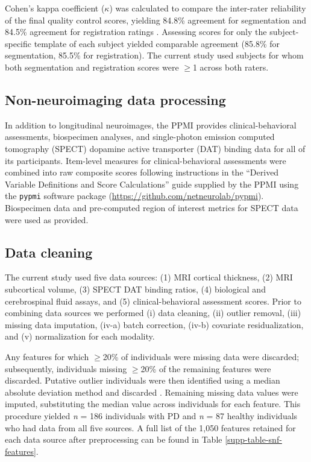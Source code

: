 \documentclass[12pt,aps,pra,reprint,showkeys]{revtex4-1}
\begin{document}
Cohen's kappa coefficient ($\kappa$) was calculated to compare the inter-rater reliability of the final quality control scores, yielding 84.8\% agreement for segmentation and 84.5\% agreement for registration ratings \citep{cohen1960coefficient}.
Assessing scores for only the subject-specific template of each subject yielded comparable agreement (85.8\% for segmentation, 85.5\% for registration).
The current study used subjects for whom both segmentation and registration scores were $\ge$1 across both raters.

\subsection*{Non-neuroimaging data processing}

In addition to longitudinal neuroimages, the PPMI provides clinical-behavioral assessments, biospecimen analyses, and single-photon emission computed tomography (SPECT) dopamine active transporter (DAT) binding data for all of its participants.
Item-level measures for clinical-behavioral assessments were combined into raw composite scores following instructions in the ``Derived Variable Definitions and Score Calculations'' guide supplied by the PPMI using the \texttt{pypmi} software package (\url{https://github.com/netneurolab/pypmi}).
Biospecimen data and pre-computed region of interest metrics for SPECT data were used as provided.

\subsection*{Data cleaning}

The current study used five data sources: (1) MRI cortical thickness, (2) MRI subcortical volume, (3) SPECT DAT binding ratios, (4) biological and cerebrospinal fluid assays, and (5) clinical-behavioral assessment scores.
Prior to combining data sources we performed (i) data cleaning, (ii) outlier removal, (iii) missing data imputation, (iv-a) batch correction, (iv-b) covariate residualization, and (v) normalization for each modality.

Any features for which $\ge$20\% of individuals were missing data were discarded; subsequently, individuals missing $\ge$20\% of the remaining features were discarded.
Putative outlier individuals were then identified using a median absolute deviation method and discarded \citep{iglewicz1993detect} .
Remaining missing data values were imputed, substituting the median value across individuals for each feature.
This procedure yielded \emph{n} = 186 individuals with PD and \emph{n} = 87 healthy individuals who had data from all five sources.
A full list of the 1,050 features retained for each data source after preprocessing can be found in Table \ref{supp-table-snf-features}.
\end{document}
